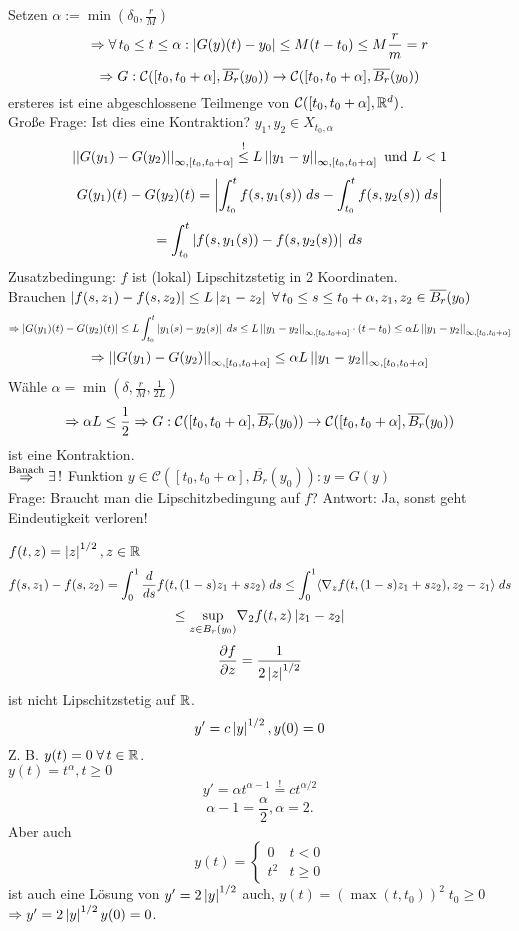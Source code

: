 \documentclass[../ana2.tex]{subfiles}
\begin{document}
Setzen \( \alpha := \min(\delta_0, \frac{r}{M}) \)
\[ \Rightarrow \forall t_0 \leq t \leq \alpha : \abs{G(y)(t)- y_0} \leq 
M(t - t_0) \leq M \frac{r}{m} = r \]
\[ \Rightarrow \abb{ G }{ \mathcal{C}([t_0, t_0 + \alpha], \overline{B_r}(y_0)) }{ \mathcal{C}([t_0, t_0 + \alpha], \overline{B_r}(y_0)) } \]
ersteres ist eine abgeschlossene Teilmenge von \( \mathcal{C}([t_0, t_0 + \alpha], \R^d) \).\\
Große Frage: Ist dies eine Kontraktion? \( y_1, y_2 \in X_{t_0, \alpha} \)
\[ \norm{G(y_1) - G(y_2) }_{\infty, [t_0, t_0 + \alpha]} \overset{!}{\leq} 
L \norm{ y_1 - y }_{\infty, [t_0, t_0 + \alpha]} \text{ und } L < 1 \]
\[ G(y_1)(t) - G(y_2)(t) 
=\abs{ \integralx{f(s, y_1(s))}{t_0}{t}{s} - \integralx{f(s, y_2(s))}{t_0}{t}{s} } \]
\[ = \integralx{\abs{ f(s,y_1(s)) - f(s, y_2(s)) }}{t_0}{t}{s} \]
Zusatzbedingung: \( f \) ist (lokal) Lipschitzstetig in 2 Koordinaten.\\
Brauchen \( \abs{ f(s,z_1) - f(s, z_2) } 
\leq L\abs{z_1 - z_2} \;\forall t_0 \leq s \leq t_0 + \alpha, z_1, z_2 \in \overline{B_r}(y_0) \)
\[ \Rightarrow \abs{G(y_1)(t) - G(y_2)(t)} 
\leq L \integralx{ \abs{ y_1(s) - y_2(s) } }{t_0}{t}{s} 
\leq L \norm{ y_1 - y_2 }_{\infty, [t_0, t_0 + \alpha]} 
\cdot (t - t_0) 
\leq \alpha L \norm{y_1 - y_2}_{\infty, [t_0, t_0 + \alpha]} \]
\[ \Rightarrow \norm{G(y_1) - G(y_2)}_{\infty , [t_0, t_0 + \alpha]} 
\leq \alpha L \norm{ y_1 - y_2 }_{\infty, [t_0, t_0 + \alpha]} \]
Wähle \( \alpha = \min(\delta, \frac{r}{M}, \frac{1}{2L}) \)
\[ \Rightarrow \alpha L \leq \frac{1}{2} 
\Rightarrow \abb{G}{ \mathcal{C}([t_0, t_0 + \alpha], \overline{B_r}(y_0)) }{\mathcal{C}([t_0, t_0 + \alpha], \overline{B_r}(y_0))} \]
ist eine Kontraktion.\\
\( \oversett{Banach}{\Rightarrow} \exists! \) Funktion 
\( y \in \mathcal{C}([t_0, t_0 + \alpha], \overline{B_r}(y_0)) : y = G(y) \)\\
Frage: Braucht man die Lipschitzbedingung auf \(f\)?
Antwort: Ja, sonst geht Eindeutigkeit verloren!
\begin{bsp}
    \(f(t, z) = \abs{z}^{1/2}, z \in \R \)\\
    \[ f(s, z_1) - f(s, z_2) = \integralx{\ddx{s} f(t, (1-s)z_1 + s z_2)}{0}{1}{s} 
    \leq \integralx{ \scalarprod{\nabla_z f(t, (1-s)z_1+sz_2)}{z_2 - z_1} }{0}{1}{s} \]
    \[ \leq \underset{z \in B_r(y_0)}{\sup} \nabla_2 f(t,z) \abs{z_1 - z_2} \]
    \[ \ddxpartialboth{f}{z} = \frac{1}{2\abs{z}^{1/2}} \] 
    ist nicht Lipschitzstetig auf \(\R\).\\
    \[ y' = c\abs{y}^{1/2}, 
    y(0) = 0 \]
    Z. B. \( y(t) = 0 \;\forall t \in \R \).\\
    \( y(t) = t^{\alpha}, t \geq 0 \)
    \[ y' = \alpha t^{\alpha - 1} 
    \overset{!}{=} c t^{\alpha/2} \]
    \[ \alpha - 1 = \frac{\alpha}{2}, \alpha = 2. \]
    Aber auch 
    \[ y(t) = \begin{cases}
        0 & t < 0 \\
        t^2 & t \geq 0
    \end{cases} \] 
    ist auch eine Lösung von \( y' = 2 \abs{y}^{1/2} \)
    auch, \(y(t) = (\max(t, t_0))^2 \; t_0 \geq 0\)
    \(\Rightarrow y'=2\abs{y}^{1/2} y(0) = 0\).
\end{bsp}
\end{document}
